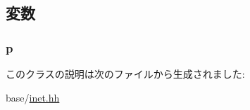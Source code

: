 \subsection{変数}
\hypertarget{classNet_1_1EthPtr_a764b18a7236ca83fd4bd750516da7d09}{
\subsubsection[{p}]{ {\bf p}}}
\label{classNet_1_1EthPtr_a764b18a7236ca83fd4bd750516da7d09}


このクラスの説明は次のファイルから生成されました:\begin{DoxyCompactItemize}
\item 
base/\hyperlink{inet_8hh}{inet.hh}\end{DoxyCompactItemize}
